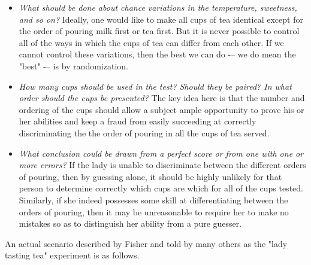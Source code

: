 \begin{itemize}
  \item \emph{What should be done about chance variations in the temperature, sweetness, and so on?}
    Ideally, one would like to make all cups of tea identical except for the order of pouring milk first or tea first. But it is never possible to control all of the ways in which the cups of tea can differ from each other. If we cannot control these variations, then the best we can do -– we do mean the "best" -– is by randomization.

  \item \emph{How many cups should be used in the test? Should they be paired? In what order should the cups be presented?} The key idea here is that the number and ordering of the cups should allow a subject ample opportunity to prove his or her abilities and keep a fraud from easily succeeding at correctly discriminating the the order of pouring in all the cups of tea served.

  \item \emph{What conclusion could be drawn from a perfect score or from one with one or more errors?} If the lady is unable to discriminate between the different orders of pouring, then by guessing alone, it should be highly unlikely for that person to determine correctly which cups are which for all of the cups tested. Similarly, if she indeed possesses some skill at differentiating between the orders of pouring, then it may be unreasonable to require her to make no mistakes so as to distinguish her ability from a pure guesser.

\end{itemize}

An actual scenario described by Fisher and told by many others as the "lady tasting tea" experiment is as follows.

